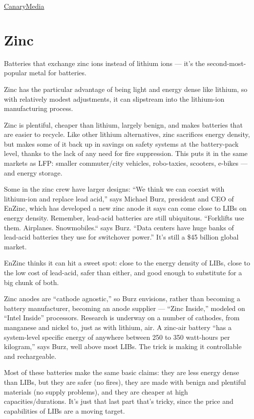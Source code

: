 \documentclass[
]{book}
\begin{document}
\href{https://www.canarymedia.com/articles/ess-is-betting-the-world-is-ready-for-a-billion-dollar-battery-disrupter/}{CanaryMedia}

\hypertarget{zinc}{%
\section{Zinc}\label{zinc}}

Batteries that exchange zinc ions instead of lithium ions --- it's the second-most-popular metal for batteries.

Zinc has the particular advantage of being light and energy dense like lithium, so with relatively modest adjustments, it can slipstream into the lithium-ion manufacturing process.

Zinc is plentiful, cheaper than lithium, largely benign, and makes batteries that are easier to recycle. Like other lithium alternatives, zinc sacrifices energy density, but makes some of it back up in savings on safety systems at the battery-pack level, thanks to the lack of any need for fire suppression. This puts it in the same markets as LFP: smaller commuter/city vehicles, robo-taxies, scooters, e-bikes --- and energy storage.

Some in the zinc crew have larger designs: ``We think we can coexist with lithium-ion and replace lead acid,'' says Michael Burz, president and CEO of EnZinc, which has developed a new zinc anode it says can come close to LIBs on energy density. Remember, lead-acid batteries are still ubiquitous. ``Forklifts use them. Airplanes. Snowmobiles.`` says Burz. ``Data centers have huge banks of lead-acid batteries they use for switchover power.'' It's still a \$45 billion global market.

EnZinc thinks it can hit a sweet spot: close to the energy density of LIBs, close to the low cost of lead-acid, safer than either, and good enough to substitute for a big chunk of both.

Zinc anodes are ``cathode agnostic,'' so Burz envisions, rather than becoming a battery manufacturer, becoming an anode supplier --- ``Zinc Inside,'' modeled on ``Intel Inside'' processors. Research is underway on a number of cathodes, from manganese and nickel to, just as with lithium, air. A zinc-air battery ``has a system-level specific energy of anywhere between 250 to 350 watt-hours per kilogram,'' says Burz, well above most LIBs. The trick is making it controllable and rechargeable.

Most of these batteries make the same basic claims: they are less energy dense than LIBs, but they are safer (no fires), they are made with benign and plentiful materials (no supply problems), and they are cheaper at high capacities/durations. It's just that last part that's tricky, since the price and capabilities of LIBs are a moving target.
\end{document}
